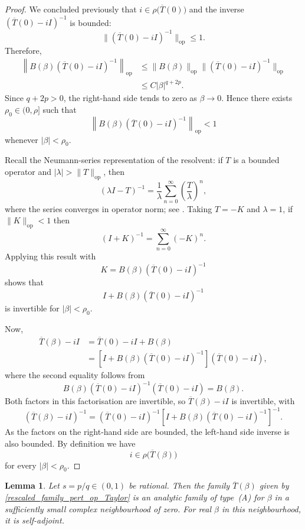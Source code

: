 \documentclass[preprint,12pt]{elsarticle}
\newtheorem{lemma}[theorem]{Lemma}
\begin{document}
\begin{proof}
We concluded previously that $i\in\rho\bigl(\overline{T}(0)\bigr)$
and the inverse $(\overline{T}(0)-iI)^{-1}$ is bounded:
\[
    \|(\overline{T}(0)-iI)^{-1}\|_{\mathrm{op}}
    \leq 1.
\]
Therefore,
\[
\begin{aligned}
    \left\|
        B(\beta)(\overline{T}(0)-iI)^{-1}
    \right\|_{\mathrm{op}}
    &\leq
    \|B(\beta)\|_{\mathrm{op}}
    \|(\overline{T}(0)-iI)^{-1}\|_{\mathrm{op}}\\
    &\leq
    C|\beta|^{q+2p}.
\end{aligned}
\]
Since $q+2p>0$, the right-hand side tends to zero as
$\beta\to0$. Hence there exists $\rho_0\in(0,\rho]$ such that
\[
    \left\|
        B(\beta)(\overline{T}(0)-iI)^{-1}
    \right\|_{\mathrm{op}}
    <1
\]
whenever $|\beta|<\rho_0$.

Recall the Neumann-series representation of the resolvent: if $T$ is
a bounded operator and $|\lambda|>\|T\|_{\mathrm{op}}$, then
\[
    (\lambda I-T)^{-1}
    =
    \frac{1}{\lambda}
    \sum_{n=0}^{\infty}
    \left(\frac{T}{\lambda}\right)^n,
\]
where the series converges in operator norm; see
\cite[equation~(VI.2), p. 191, Section~VI.3, Vol. 1 ]{RS}.
Taking $T=-K$ and $\lambda=1$, if
$\|K\|_{\mathrm{op}}<1$ then
\[
    (I+K)^{-1}
    =
    \sum_{n=0}^{\infty}(-K)^n.
\]
Applying this result with
\[
    K
    =
    B(\beta)(\overline{T}(0)-iI)^{-1}
\]
shows that
\[
    I+B(\beta)(\overline{T}(0)-iI)^{-1}
\]
is invertible for $|\beta|<\rho_0$.

Now,
\[
\begin{aligned}
    \overline{T}(\beta)-iI
    &=
    \overline{T}(0)-iI+B(\beta)\\
    &=
    \left[
        I+B(\beta)(\overline{T}(0)-iI)^{-1}
    \right]
    (\overline{T}(0)-iI),
\end{aligned}
\]
where the second equality follows from
\[
    B(\beta)(\overline{T}(0)-iI)^{-1}
    (\overline{T}(0)-iI)
    =
    B(\beta).
\]
Both factors in this factorisation are invertible, so 
$\overline{T}(\beta)-iI$ is invertible, with
\[
    (\overline{T}(\beta)-iI)^{-1}
    =
    (\overline{T}(0)-iI)^{-1}
    \left[
        I+B(\beta)(\overline{T}(0)-iI)^{-1}
    \right]^{-1}.
\]
As the factors on the right-hand side are bounded, the left-hand side inverse is also bounded. By definition we have
\[
    i\in\rho\bigl(\overline{T}(\beta)\bigr)
\]
for every $|\beta|<\rho_0$.
\end{proof}

\begin{lemma}\label{lemma_rescaled_analytic_family_A}
Let $s=p/q\in(0,1)$ be rational. Then the family
$\overline{T}(\beta)$ given by
\eqref{rescaled_family_pert_op_Taylor} is an analytic family of type~(A)
for $\beta$ in a sufficiently small complex neighbourhood of zero. For
real $\beta$ in this neighbourhood, it is self-adjoint.
\end{lemma}
\end{document}

